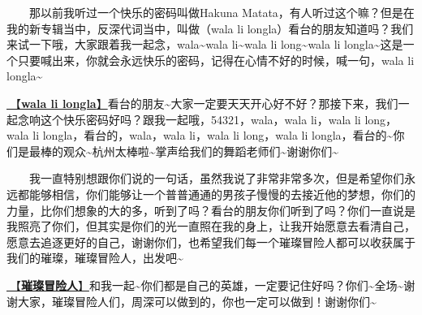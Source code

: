 \documentclass[]{ctexbook}
\begin{document}
  那以前我听过一个快乐的密码叫做Hakuna Matata，有人听过这个嘛？但是在我的新专辑当中，反深代词当中，叫做（wala li longla）看台的朋友知道吗？我们来试一下哦，大家跟着我一起念，wala\textasciitilde wala li\textasciitilde wala li long\textasciitilde wala li longla\textasciitilde 这是一个只要喊出来，你就会永远快乐的密码，记得在心情不好的时候，喊一句，wala li longla\textasciitilde{}

\hyperref[wala-li-longla]{🎵【\textbf{wala li longla}】}看台的朋友\textasciitilde 大家一定要天天开心好不好？那接下来，我们一起念响这个快乐密码好吗？跟我一起哦，54321，wala，wala li，wala li long，wala li longla，看台的，wala，wala li，wala li long，wala li longla，看台的\textasciitilde 你们是最棒的观众\textasciitilde 杭州太棒啦\textasciitilde 掌声给我们的舞蹈老师们\textasciitilde 谢谢你们\textasciitilde{}

  我一直特别想跟你们说的一句话，虽然我说了非常非常多次，但是希望你们永远都能够相信，你们能够让一个普普通通的男孩子慢慢的去接近他的梦想，你们的力量，比你们想象的大的多，听到了吗？看台的朋友你们听到了吗？你们一直说是我照亮了你们，但其实是你们的光一直照在我的身上，让我开始愿意去看清自己，愿意去追逐更好的自己，谢谢你们，也希望我们每一个璀璨冒险人都可以收获属于我们的璀璨，璀璨冒险人，出发吧\textasciitilde{}

\hyperref[adventurers]{🎵【\textbf{璀璨冒险人}】}和我一起\textasciitilde 你们都是自己的英雄，一定要记住好吗？你们\textasciitilde 全场\textasciitilde 谢谢大家，璀璨冒险人们，周深可以做到的，你也一定可以做到！谢谢你们\textasciitilde{}
\end{document}
